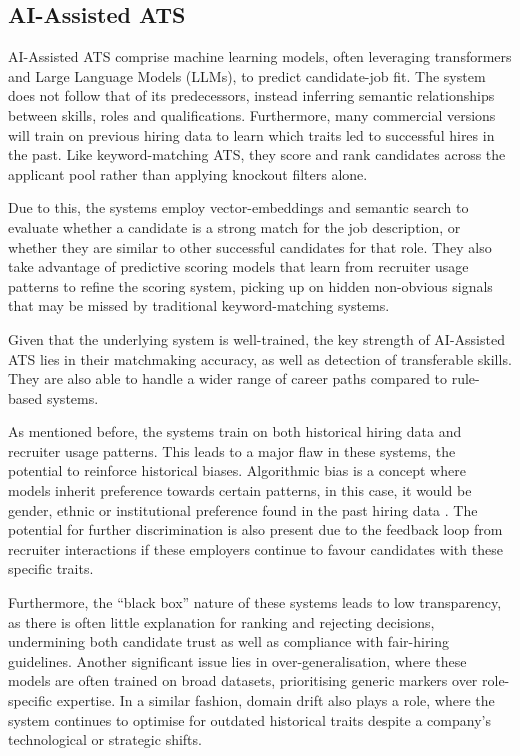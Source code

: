 \subsection{AI-Assisted ATS}
AI-Assisted ATS comprise machine learning models, often leveraging transformers and Large Language Models (LLMs), 
to predict candidate-job fit. The system does not follow that of its predecessors, instead inferring semantic 
relationships between skills, roles and qualifications. Furthermore, many commercial versions will train on previous 
hiring data to learn which traits led to successful hires in the past.
Like keyword-matching ATS, they score and rank candidates across the applicant pool rather than applying knockout filters alone.

Due to this, the systems employ vector-embeddings and semantic search to evaluate whether a candidate is a strong 
match for the job description, or whether they are similar to other successful candidates for that role. They also take advantage
of predictive scoring models that learn from recruiter usage patterns to refine the scoring system,
picking up on hidden non-obvious signals that may be missed by traditional keyword-matching systems.

Given that the underlying system is well-trained, the key strength of AI-Assisted ATS lies in their
matchmaking accuracy, as well as detection of transferable skills. They are also able to handle 
a wider range of career paths compared to rule-based systems.

As mentioned before, the systems train on both historical hiring data and recruiter usage patterns.
This leads to a major flaw in these systems, the potential to reinforce historical biases.
Algorithmic bias is a concept where models inherit preference towards certain patterns, in this case,
it would be gender, ethnic or institutional preference found in the past hiring data \cite{raghavan2020,bogen2018}.
The potential for further discrimination is also present due to the feedback loop from recruiter interactions
if these employers continue to favour candidates with these specific traits.

Furthermore, the “black box” nature of these systems leads to low transparency, as there 
is often little explanation for ranking and rejecting decisions, undermining both 
candidate trust as well as compliance with fair-hiring guidelines.
Another significant issue lies in over-generalisation, where these models are often 
trained on broad datasets, prioritising generic markers over role-specific expertise.
In a similar fashion, domain drift also plays a role, where the system continues to 
optimise for outdated historical traits despite a company's technological or strategic shifts.

